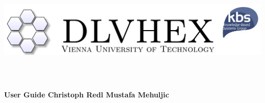 \documentclass[14pt,a4paper, titlepage]{article}
\begin{document}
\setcounter{page}{3}
\newcommand{\dlvhex}{{\sc dlvhex}}
\newcommand{\hex}{{\sc hex}}
\setcounter{secnumdepth}{4} %
\setcounter{tocdepth}{4}    %

\begin{titlepage}
    \centering
    \vfill
    \includegraphics[width=15cm,height=6cm]{biglogo_whitebg}
    \vfill
    {\bfseries\Large
        User Guide
        \vskip4cm
        Christoph Redl\vskip1cm Mustafa Mehuljic
    }    
    
\end{titlepage}

\begin{abstract}
This document provides a user guide for the Answer Set Programming(ASP) system called \dlvhex{} developed at Vienna University of Technology. ASP is a declarative problem solving paradigm, rooted in Logic Programming and Nonmonotonic Reasoning, which has been gaining increasing attention during the last years. The \dlvhex{} system is a logic-programming reasoner for computing the models of so-called \hex{}-programs, which are an extension of \textbf{answer-set programs} towards integration of \textbf{external computation sources}. This guide aims at enabling users of this system to interoperate with a broader set of external computation sources. The guide refers to release 2.4.     
\end{abstract}

\tableofcontents

\newpage
\end{document}
